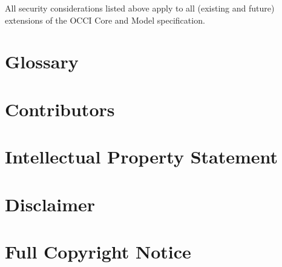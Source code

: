 \documentclass[10pt,a4paper]{article}
\begin{document}
All security considerations listed above apply to all (existing and future)
extensions of the OCCI Core and Model specification.

\section{Glossary}
\label{sec:glossary}


\section{Contributors}


\section{Intellectual Property Statement}


\section{Disclaimer}


\section{Full Copyright Notice}




\end{document}
